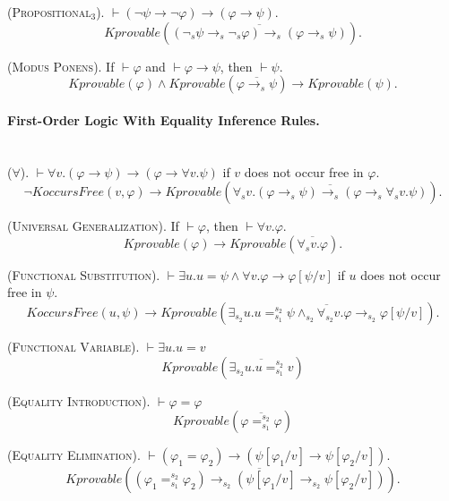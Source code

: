 \documentclass[UTF8,11pt]{article}
\theoremstyle{plain}
\theoremstyle{definition}
\theoremstyle{remark}
\newcommand{\KoccursFree}{\mathit{KoccursFree}}
\newcommand{\Kdeduce}{\mathit{Kprovable}}
\begin{document}
(\textsc{Propositional$_3$}).\quad
$\vdash (\neg \psi \to \neg \varphi) \to (\varphi \to \psi)$.
\begin{equation*}
\Kdeduce(\overline{(\neg_s \psi \to_s \neg_s \varphi) 
\to_s (\varphi 
\to_s \psi)}).
\end{equation*}

(\textsc{Modus Ponens}).\quad
If $\vdash \varphi$ and $\vdash \varphi \to \psi$, then $\vdash \psi$.
\begin{equation*}
\Kdeduce(\varphi) \wedge \Kdeduce(\overline{\varphi \to_s \psi}) 
\to 
\Kdeduce(\psi).
\end{equation*}

\paragraph{First-Order Logic With Equality Inference Rules.} \quad
\\

(\textsc{$\forall$}).\quad
$\vdash \forall v . (\varphi \to \psi) \to (\varphi \to \forall v . \psi)$ if 
$v$ does not occur free in $\varphi$. 
\begin{equation*}
\neg\KoccursFree(v, \varphi)
\to \Kdeduce(\overline{\forall_s v . (\varphi \to_s	\psi) \to_s (\varphi \to_s 
\forall_s v . \psi)}).
\end{equation*}

(\textsc{Universal Generalization}).\quad
If $\vdash \varphi$, then $\vdash \forall v . \varphi$.
\begin{equation*}
\Kdeduce(\varphi) \to \Kdeduce(\overline{\forall_s v . \varphi}).
\end{equation*}

(\textsc{Functional Substitution}).\quad
$\vdash \exists u . u = \psi \wedge \forall v . \varphi \to \varphi[\psi/v]$ if 
$u$ does not occur free in $\psi$.
\begin{equation*}
\KoccursFree(u, \psi) \to
\Kdeduce(\overline{\exists_{s_2} u . u =_{s_1}^{s_2} \psi \wedge_{s_2} 
\forall_{s_2} v . \varphi \to_{s_2} \varphi[\psi/v]}).
\end{equation*}

(\textsc{Functional Variable}). \quad
$\vdash \exists u . u =v $
$$
\Kdeduce(\overline{\exists_{s_2} u . u =_{s_1}^{s_2} v})
$$

(\textsc{Equality Introduction}).\quad
$\vdash \varphi = \varphi$
$$\Kdeduce(\overline{\varphi =_{s_1}^{s_2} \varphi})$$

(\textsc{Equality Elimination}).\quad
$\vdash (\varphi_1 = \varphi_2) \to (\psi[\varphi_1/v] \to \psi[\varphi_2/v])$.
\begin{equation*}
\Kdeduce(\overline{(\varphi_1 =_{s_1}^{s_2} \varphi_2) \to_{s_2} 
(\psi[\varphi_1/v] \to_{s_2} \psi[\varphi_2/v])}).
\end{equation*}
\end{document}
